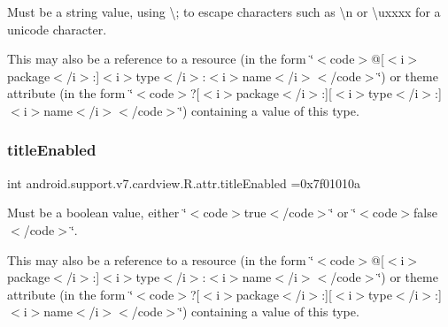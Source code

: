 Must be a string value, using \textquotesingle{}\textbackslash{};\textquotesingle{} to escape characters such as \textquotesingle{}\textbackslash{}n\textquotesingle{} or \textquotesingle{}\textbackslash{}uxxxx\textquotesingle{} for a unicode character. 

This may also be a reference to a resource (in the form \char`\"{}$<$code$>$@\mbox{[}$<$i$>$package$<$/i$>$\+:\mbox{]}$<$i$>$type$<$/i$>$\+:$<$i$>$name$<$/i$>$$<$/code$>$\char`\"{}) or theme attribute (in the form \char`\"{}$<$code$>$?\mbox{[}$<$i$>$package$<$/i$>$\+:\mbox{]}\mbox{[}$<$i$>$type$<$/i$>$\+:\mbox{]}$<$i$>$name$<$/i$>$$<$/code$>$\char`\"{}) containing a value of this type. \mbox{\label{classandroid_1_1support_1_1v7_1_1cardview_1_1R_1_1attr_a2d1b48caa3eb8f5dc01cf4ef925c372d}} 
\subsubsection{\texorpdfstring{title\+Enabled}{titleEnabled}}
{\footnotesize\ttfamily int android.\+support.\+v7.\+cardview.\+R.\+attr.\+title\+Enabled =0x7f01010a\hspace{0.3cm}{\ttfamily [static]}}

Must be a boolean value, either \char`\"{}$<$code$>$true$<$/code$>$\char`\"{} or \char`\"{}$<$code$>$false$<$/code$>$\char`\"{}. 

This may also be a reference to a resource (in the form \char`\"{}$<$code$>$@\mbox{[}$<$i$>$package$<$/i$>$\+:\mbox{]}$<$i$>$type$<$/i$>$\+:$<$i$>$name$<$/i$>$$<$/code$>$\char`\"{}) or theme attribute (in the form \char`\"{}$<$code$>$?\mbox{[}$<$i$>$package$<$/i$>$\+:\mbox{]}\mbox{[}$<$i$>$type$<$/i$>$\+:\mbox{]}$<$i$>$name$<$/i$>$$<$/code$>$\char`\"{}) containing a value of this type. \mbox{\label{classandroid_1_1support_1_1v7_1_1cardview_1_1R_1_1attr_ace29ea625b906bbd584e71a4b1d16516}} 
